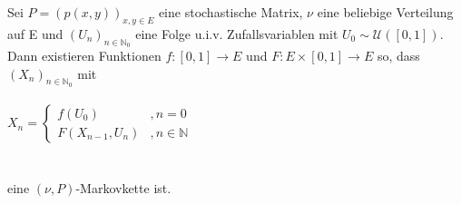 Sei $P = (p(x,y))_{x,y \in E}$ eine stochastische Matrix, $\nu$ eine beliebige Verteilung auf E und $(U_{n})_{n \in \mathbb{N}_{0}}$ eine Folge u.i.v. Zufallsvariablen mit $U_{0} \sim \mathcal{U}([0,1])$.
\\
Dann existieren Funktionen $f:[0,1] \to E$ und $F:E \times [0,1] \to E$ so, dass $(X_{n})_{n \in \mathbb{N}_{0}}$ mit
\\
\\
$X_{n}=
\begin{cases}
f(U_{0})  &  , n=0  \\
F(X_{n-1},U_{n})  & , n \in \mathbb{N}
\end{cases}$
\\
\\
\\
eine $(\nu,P)$-Markovkette ist.